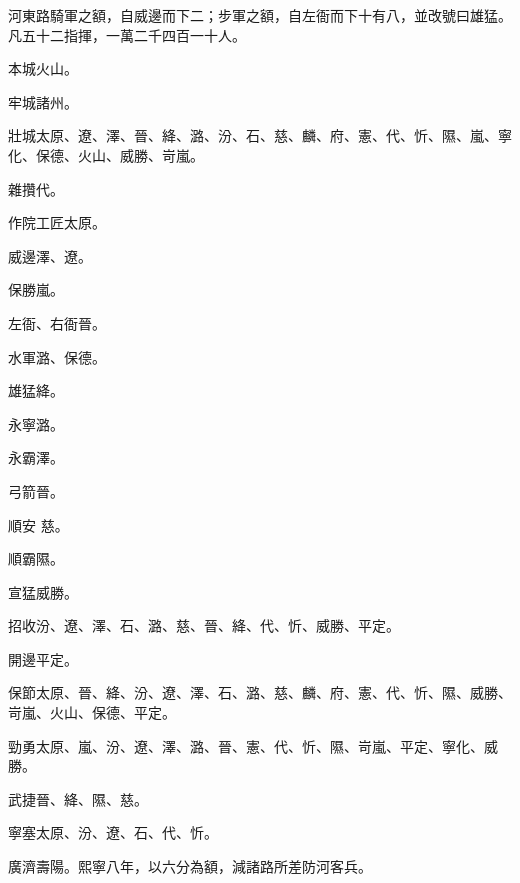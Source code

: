 \begin{pinyinscope}
 河東路騎軍之額，自威邊而下二；步軍之額，自左衙而下十有八，並改號曰雄猛。凡五十二指揮，一萬二千四百一十人。



 本城火山。



 牢城諸州。



 壯城太原、遼、澤、晉、絳、潞、汾、石、慈、麟、府、憲、代、忻、隰、嵐、寧化、保德、火山、威勝、岢嵐。



 雜攢代。



 作院工匠太原。



 威邊澤、遼。



 保勝嵐。



 左衙、右衙晉。



 水軍潞、保德。



 雄猛絳。



 永寧潞。



 永霸澤。



 弓箭晉。



 順安
 慈。



 順霸隰。



 宣猛威勝。



 招收汾、遼、澤、石、潞、慈、晉、絳、代、忻、威勝、平定。



 開邊平定。



 保節太原、晉、絳、汾、遼、澤、石、潞、慈、麟、府、憲、代、忻、隰、威勝、岢嵐、火山、保德、平定。



 勁勇太原、嵐、汾、遼、澤、潞、晉、憲、代、忻、隰、岢嵐、平定、寧化、威勝。



 武捷晉、絳、隰、慈。



 寧塞太原、汾、遼、石、代、忻。



 廣濟壽陽。熙寧八年，以六分為額，減諸路所差防河客兵。




\end{pinyinscope}
